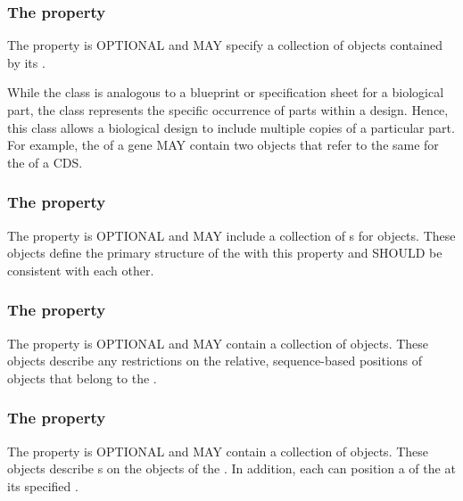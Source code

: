 \subsubsection*{The  property}
\label{sec:components}

The  property is OPTIONAL and MAY specify a collection of  objects contained by its .

While the  class is analogous to a blueprint or specification sheet for a biological part, the  class represents the specific occurrence of parts within a design. Hence, this class allows a biological design to include multiple copies of a particular part. For example, the  of a gene MAY contain two  objects that refer to the same  for the  of a CDS.

\subsubsection*{The  property}
\label{sec:sequences}
The  property is OPTIONAL and MAY include a collection of s for  objects. These objects define the primary structure of the  with this property and SHOULD be consistent with each other.

\subsubsection*{The  property}
\label{sec:sequenceConstraints}

The  property is OPTIONAL and MAY contain a collection of  objects. These objects describe any restrictions on the relative, sequence-based positions of  objects that belong to the .

\subsubsection*{The  property}
\label{sec:sequenceAnnotations}

The  property is OPTIONAL and MAY contain a collection of  objects. These objects describe  s on the  objects of the  . In addition, each  can  position a  of the  at its specified .

